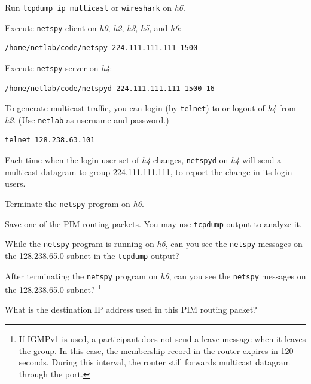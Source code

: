 \documentclass{../UTNetLab}
\begin{document}
    Run \lstinline{tcpdump ip multicast} or \lstinline{wireshark} on \textit{h6}. 

    Execute \lstinline{netspy} client on \textit{h0}, \textit{h2}, \textit{h3}, \textit{h5}, and \textit{h6}:

    \begin{lstlisting}
/home/netlab/code/netspy 224.111.111.111 1500
    \end{lstlisting}

    Execute \lstinline{netspy} server on \textit{h4}:

    \begin{lstlisting}
/home/netlab/code/netspyd 224.111.111.111 1500 16
    \end{lstlisting}
    
    To generate multicast traffic, you can login (by \lstinline{telnet}) to or logout of \textit{h4} from \textit{h2}. (Use \texttt{netlab} as username and password.)

    \begin{lstlisting}
telnet 128.238.63.101
    \end{lstlisting}

    Each time when the login user set of \textit{h4} changes, \lstinline{netspyd} on \textit{h4} will send a multicast datagram to group 224.111.111.111, to report the change in its login users.

    Terminate the \lstinline{netspy} program on \textit{h6}.

    Save one of the PIM routing packets.
    You may use \lstinline{tcpdump} output to analyze it.
    
    \begin{report}
    \item While the \lstinline{netspy} program is running on \textit{h6},
    can you see the \lstinline{netspy} messages on the 128.238.65.0 subnet in the \lstinline{tcpdump} output?

    \item After terminating the \lstinline{netspy} program on \textit{h6},
    can you see the \lstinline{netspy} messages on the 128.238.65.0 subnet?%
    \footnote{If IGMPv1 is used, a participant does not send a leave message when it leaves the group.
    In this case, the membership record in the router expires in 120 seconds.
    During this interval, the router still forwards multicast datagram through the port.} 

    \item What is the destination IP address used in this PIM routing packet?
    \end{report}
\end{document}
